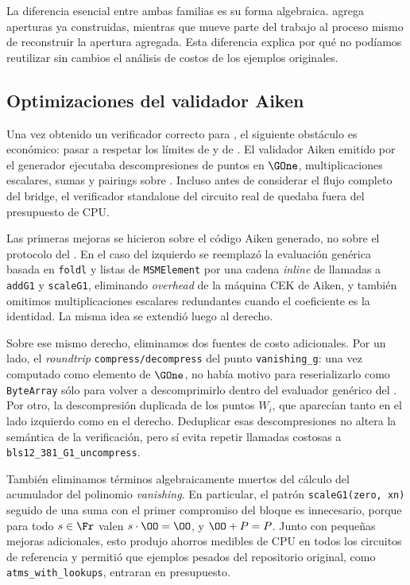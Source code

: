 La diferencia esencial entre ambas familias es su forma algebraica. \GWCNineteen agrega aperturas \KZG ya construidas, mientras que \HaloTwoMultiOpen mueve parte del trabajo al proceso mismo de reconstruir la apertura agregada. Esta diferencia explica por qué no podíamos reutilizar sin cambios el análisis de costos de los ejemplos originales.

\subsection{Optimizaciones del validador Aiken}

Una vez obtenido un verificador correcto para \MidnightSTMCircuit, el siguiente obstáculo es económico: pasar a respetar los límites de \maxTxSize y \maxTxExUnits de \Cardano. El validador Aiken emitido por el generador ejecutaba descompresiones de puntos en $\GOne$, multiplicaciones escalares, sumas y pairings sobre \BLS. Incluso antes de considerar el flujo completo del bridge, el verificador standalone del circuito real de \Mithril quedaba fuera del presupuesto de CPU.

Las primeras mejoras se hicieron sobre el código Aiken generado, no sobre el protocolo del \zkBridge. En el caso del \MSM izquierdo se reemplazó la evaluación genérica basada en \texttt{foldl} y listas de \texttt{MSMElement} por una cadena \textit{inline} de llamadas a \texttt{addG1} y \texttt{scaleG1}, eliminando \textit{overhead} de la máquina CEK de Aiken, y también omitimos multiplicaciones escalares redundantes cuando el coeficiente es la identidad. La misma idea se extendió luego al \MSM derecho.

Sobre ese mismo \MSM derecho, eliminamos dos fuentes de costo adicionales. Por un lado, el \textit{roundtrip} \texttt{compress/decompress} del punto \texttt{vanishing\_g}: una vez computado como elemento de $\GOne$, no había motivo para reserializarlo como \texttt{ByteArray} sólo para volver a descomprimirlo dentro del evaluador genérico del \MSM. Por otro, la descompresión duplicada de los puntos $W_i$, que aparecían tanto en el lado izquierdo como en el derecho. Deduplicar esas descompresiones no altera la semántica de la verificación, pero sí evita repetir llamadas costosas a \texttt{bls12\_381\_G1\_uncompress}.

También eliminamos términos algebraicamente muertos del cálculo del acumulador del polinomio \textit{vanishing}. En particular, el patrón \texttt{scaleG1(zero, xn)} seguido de una suma con el primer compromiso del bloque es innecesario, porque para todo $s \in \Fr$ valen $s \cdot \OO = \OO$, y $\OO + P = P$. Junto con pequeñas mejoras adicionales, esto produjo ahorros medibles de CPU en todos los circuitos de referencia y permitió que ejemplos pesados del repositorio original, como \texttt{atms\_with\_lookups}, entraran en presupuesto.

